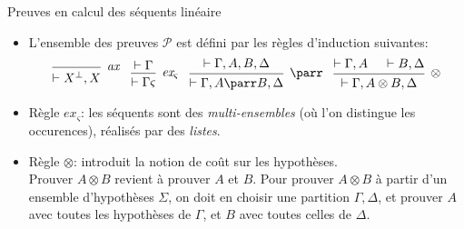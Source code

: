 \documentclass{beamer}
\newcommand*{\orth}{^\perp}
\newcommand*{\tensor}{\otimes}
\newcommand*{\hypv}[1]{\hypo{\vdash #1}}
\newcommand*{\axv}[1]{\infer{0}[\ensuremath{\mathit{ax}}]{\vdash #1}}
\newcommand*{\tensorv}[1]{\infer{2}[\ensuremath{\tensor}]{\vdash #1}}
\newcommand*{\parrv}[1]{\infer{1}[\ensuremath{\parr}]{\vdash #1}}
\newcommand*{\permv}[2]{\infer{1}[\ensuremath{\textit{ex}_{#1}}]{\vdash #2}}
\newcommand*{\permapp}[2]{#2 #1}
\newcommand*{\someperm}{\varsigma}
\newcommand*{\sequent}{\Gamma}
\newcommand*{\sequentbis}{\Delta}
\newcommand*{\proofs}{\ensuremath{\mathcal{P}}}
\begin{document}
\begin{frame}{Preuves en calcul des séquents linéaire}
    \begin{itemize}
        \item L'ensemble des preuves \proofs{} est défini par les règles d'induction suivantes:\pause
            \begin{equation*}
            \begin{prooftree}
              \axv{X\orth, X}
            \end{prooftree}
            \; \; \;
            \begin{prooftree}
              \hypv{\sequent}
              \permv{\someperm}{\permapp{\someperm}{\sequent}}
            \end{prooftree}
            \; \; \;
            \begin{prooftree}
              \hypv{\sequent, A, B, \sequentbis}
              \parrv{\sequent, A \parr B, \sequentbis}
            \end{prooftree}
            \; \; \;
            \begin{prooftree}
              \hypv{\sequent, A}
              \hypv{B, \sequentbis}
              \tensorv{\sequent, A \tensor B, \sequentbis}
            \end{prooftree}
            \end{equation*}
            \pause
        \item Règle $\textit{ex}_{\someperm}$: les séquents sont des \textit{multi-ensembles} (où l'on distingue les occurences), réalisés par des \textit{listes}.
            \pause
        \item Règle $\tensor$: introduit la notion de coût sur les hypothèses.\\
        \pause Prouver $A \tensor B$ revient à prouver $A$ et $B$. Pour prouver $A \tensor B$ à partir d'un ensemble d'hypothèses $\Sigma$, on doit en choisir une partition $\sequent, \sequentbis$, et prouver $A$ avec toutes les hypothèses de $\sequent$, et $B$ avec toutes celles de $\sequentbis$.
    \end{itemize}
\end{frame}
\end{document}
